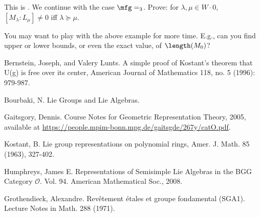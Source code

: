 	\begin{exe}
		This is . We continue with the case $\mfg = \sl_3$. Prove: for $\lambda,\mu \in W\cdot 0$, $[M_\lambda: L_\mu] \neq 0$ iff $\lambda \succeq \mu$.
	\end{exe}


	You may want to play with the above example for more time. E.g., can you find upper or lower bounds, or even the exact value, of $\length(M_0)$?


	
\begin{thebibliography}{Yau}
	
	 Bernstein, Joseph, and Valery Lunts. A simple proof of Kostant's theorem that U(g) is free over its center, American Journal of Mathematics 118, no. 5 (1996): 979-987.

	 Bourbaki, N. Lie Groups and Lie Algebras.

	 Gaitsgory, Dennis. Course Notes for Geometric Representation Theory, 2005, available at \url{https://people.mpim-bonn.mpg.de/gaitsgde/267y/catO.pdf}.

	 Kostant, B. Lie group representations on polynomial rings, Amer. J. Math. 85 (1963), 327-402.

	 Humphreys, James E. Representations of Semisimple Lie Algebras in the BGG Category $\mathcal{O} $. Vol. 94. American Mathematical Soc., 2008.

	 Grothendieck, Alexandre. Revêtement étales et groupe fondamental (SGA1). Lecture Notes in Math. 288 (1971).


\end{thebibliography}

 


